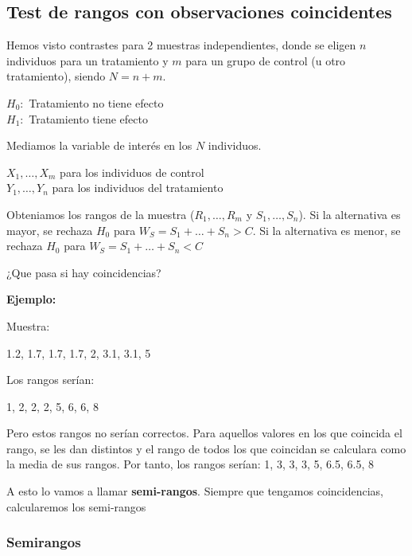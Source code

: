 \subsection{Test de rangos con observaciones coincidentes}

Hemos visto contrastes para 2 muestras independientes, donde se eligen $n$ individuos para un tratamiento y $m$ para un grupo de control (u otro tratamiento), siendo $N=n+m$.
\begin{center}
    $H_0:$ Tratamiento no tiene efecto \\
    $H_1:$ Tratamiento tiene efecto
\end{center}

Mediamos la variable de interés en los $N$ individuos.
\begin{center}
    $X_1,\dots,X_m$ para los individuos de control \\
    $Y_1,\dots,Y_n$ para los individuos del tratamiento
\end{center}

Obteniamos los rangos de la muestra ($R_1,\dots,R_m$ y $S_1,\dots,S_n$).
Si la alternativa es mayor, se rechaza $H_0$ para $W_S=S_1+\dots+S_n>C$.
Si la alternativa es menor, se rechaza $H_0$ para $W_S=S_1+\dots+S_n<C$

¿Que pasa si hay coincidencias?

\newpage

\noindent \textbf{Ejemplo: }

Muestra:

\begin{center}
    1.2, 1.7, 1.7, 1.7, 2, 3.1, 3.1, 5
\end{center}

Los rangos serían:

\begin{center}
    1, 2, 2, 2, 5, 6, 6, 8
\end{center}

Pero estos rangos no serían correctos. Para aquellos valores en los que coincida el rango, se les dan distintos y el rango de todos los que coincidan se calculara como la media de sus rangos. Por tanto, los rangos serían:
1, 3, 3, 3, 5, 6.5, 6.5, 8

A esto lo vamos a llamar \textbf{semi-rangos}. Siempre que tengamos coincidencias, calcularemos los semi-rangos

\subsubsection{Semirangos}

